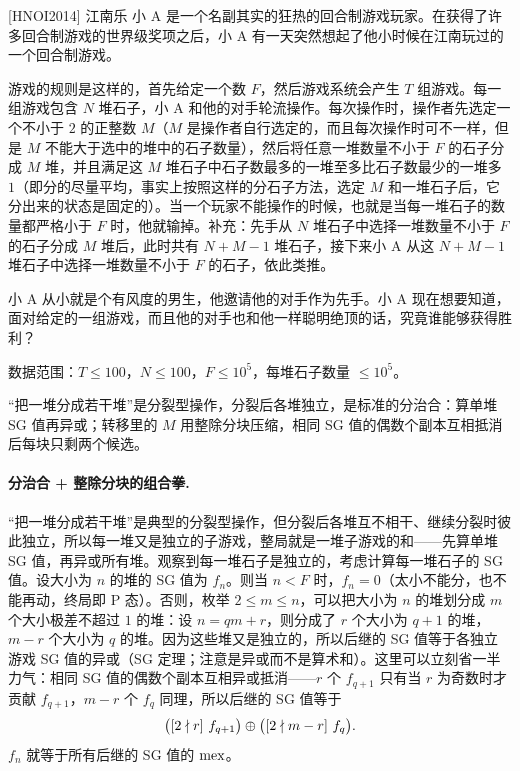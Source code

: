 \begin{problem}{[HNOI2014] 江南乐}
小 A 是一个名副其实的狂热的回合制游戏玩家。在获得了许多回合制游戏的世界级奖项之后，小 A 有一天突然想起了他小时候在江南玩过的一个回合制游戏。

游戏的规则是这样的，首先给定一个数 $F$，然后游戏系统会产生 $T$ 组游戏。每一组游戏包含 $N$ 堆石子，小 A 和他的对手轮流操作。每次操作时，操作者先选定一个不小于 $2$ 的正整数 $M$（$M$ 是操作者自行选定的，而且每次操作时可不一样，但是 $M$ 不能大于选中的堆中的石子数量），然后将任意一堆数量不小于 $F$ 的石子分成 $M$ 堆，并且满足这 $M$ 堆石子中石子数最多的一堆至多比石子数最少的一堆多 $1$（即分的尽量平均，事实上按照这样的分石子方法，选定 $M$ 和一堆石子后，它分出来的状态是固定的）。当一个玩家不能操作的时候，也就是当每一堆石子的数量都严格小于 $F$ 时，他就输掉。补充：先手从 $N$ 堆石子中选择一堆数量不小于 $F$ 的石子分成 $M$ 堆后，此时共有 $N+M-1$ 堆石子，接下来小 A 从这 $N+M-1$ 堆石子中选择一堆数量不小于 $F$ 的石子，依此类推。

小 A 从小就是个有风度的男生，他邀请他的对手作为先手。小 A 现在想要知道，面对给定的一组游戏，而且他的对手也和他一样聪明绝顶的话，究竟谁能够获得胜利？

数据范围：$T\le100$，$N\le100$，$F\le10^{5}$，每堆石子数量 $\le10^{5}$。
\end{problem}

\hint “把一堆分成若干堆”是分裂型操作，分裂后各堆独立，是标准的分治合：算单堆 SG 值再异或；转移里的 $M$ 用整除分块压缩，相同 SG 值的偶数个副本互相抵消后每块只剩两个候选。

\sol \paragraph{分治合 + 整除分块的组合拳.} “把一堆分成若干堆”是典型的分裂型操作，但分裂后各堆互不相干、继续分裂时彼此独立，所以每一堆又是独立的子游戏，整局就是一堆子游戏的和——先算单堆 SG 值，再异或所有堆。观察到每一堆石子是独立的，考虑计算每一堆石子的 SG 值。设大小为 $n$ 的堆的 SG 值为 $f_n$。则当 $n<F$ 时，$f_n=0$（太小不能分，也不能再动，终局即 P 态）。否则，枚举 $2\le m\le n$，可以把大小为 $n$ 的堆划分成 $m$ 个大小极差不超过 $1$ 的堆：设 $n=qm+r$，则分成了 $r$ 个大小为 $q+1$ 的堆，$m-r$ 个大小为 $q$ 的堆。因为这些堆又是独立的，所以后继的 SG 值等于各独立游戏 SG 值的异或（SG 定理；注意是异或而不是算术和）。这里可以立刻省一半力气：相同 SG 值的偶数个副本互相异或抵消——$r$ 个 $f_{q+1}$ 只有当 $r$ 为奇数时才贡献 $f_{q+1}$，$m-r$ 个 $f_q$ 同理，所以后继的 SG 值等于
\[
 \bigl(\left[2\nmid r\right]\,f_{q+1}\bigr)\oplus\bigl(\left[2\nmid m-r\right]\,f_q\bigr).
\]
$f_n$ 就等于所有后继的 SG 值的 $\operatorname{mex}$。

